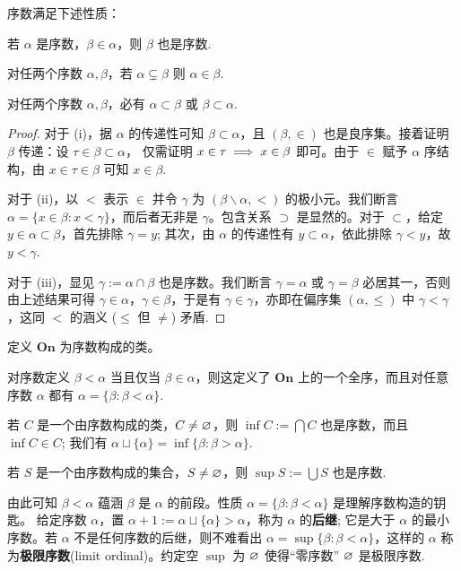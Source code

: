 \begin{lemma}\label{prop:ordinal-property}
	序数满足下述性质：
	\begin{compactenum}[(i)]
		\item 若 $\alpha$ 是序数，$\beta \in \alpha$，则 $\beta$ 也是序数.
		\item 对任两个序数 $\alpha,\beta$，若 $\alpha \subsetneq \beta$ 则 $\alpha \in \beta$.
		\item 对任两个序数 $\alpha,\beta$，必有 $\alpha \subset \beta$ 或 $\beta \subset \alpha$.
	\end{compactenum}
\end{lemma}
\begin{proof}
	对于 (i)，据 $\alpha$ 的传递性可知 $\beta \subset \alpha$，且 $(\beta,\in)$ 也是良序集。接着证明 $\beta$ 传递：设 $\tau \in \beta \subset \alpha$， 仅需证明 $x \in \tau \implies x \in \beta$ 即可。由于 $\in$ 赋予 $\alpha$ 序结构，由 $x \in \tau \in \beta$ 可知 $x \in \beta$.

	对于 (ii)，以 $<$ 表示 $\in$ 并令 $\gamma$ 为 $(\beta \backslash \alpha, <)$ 的极小元。我们断言 $\alpha = \{x \in \beta : x < \gamma \}$，而后者无非是 $\gamma$。包含关系 $\supset$ 是显然的。对于 $\subset$，给定 $y \in \alpha \subset \beta$，首先排除 $\gamma = y$; 其次，由 $\alpha$ 的传递性有 $y \subset \alpha$，依此排除 $\gamma < y$，故 $y < \gamma$.

	对于 (iii)，显见 $\gamma := \alpha \cap \beta$ 也是序数。我们断言 $\gamma = \alpha$ 或 $\gamma = \beta$ 必居其一，否则由上述结果可得 $\gamma \in \alpha$，$\gamma \in \beta$，于是有 $\gamma \in \gamma$，亦即在偏序集 $(\alpha,\leqslant)$ 中 $\gamma < \gamma$，这同 $<$ 的涵义 ($\leqslant$ 但 $\neq$) 矛盾.
\end{proof}

\begin{theorem}\label{prop:On-wellorder}
	定义 $\mathbf{On}$ 为序数构成的类。
	\begin{compactitem}
		\item 对序数定义 $\beta < \alpha$ 当且仅当 $\beta \in \alpha$，则这定义了 $\mathbf{On}$ 上的一个全序，而且对任意序数 $\alpha$ 都有 $\alpha = \{ \beta : \beta < \alpha \}$.
		\item 若 $C$ 是一个由序数构成的类，$C \neq \varnothing$，则 $\inf C := \bigcap C$ 也是序数，而且 $\inf C \in C$; 我们有 $\alpha \sqcup \{\alpha\} = \inf\{ \beta: \beta > \alpha \}$.
		\item 若 $S$ 是一个由序数构成的集合，$S \neq \varnothing$，则 $\sup S := \bigcup S$ 也是序数.
	\end{compactitem}
\end{theorem}
由此可知 $\beta < \alpha$ 蕴涵 $\beta$ 是 $\alpha$ 的前段。性质 $\alpha = \{\beta: \beta < \alpha \}$ 是理解序数构造的钥匙。
给定序数 $\alpha$，置 $\alpha + 1 := \alpha \sqcup \{\alpha\} > \alpha$，称为 $\alpha$ 的\textbf{后继}; 它是大于 $\alpha$ 的最小序数。若 $\alpha$ 不是任何序数的后继，则不难看出 $\alpha = \sup\{\beta: \beta < \alpha\}$，这样的 $\alpha$ 称为\textbf{极限序数}(limit ordinal)。约定空 $\sup$ 为 $\varnothing$ 使得“零序数” $\varnothing$ 是极限序数.

